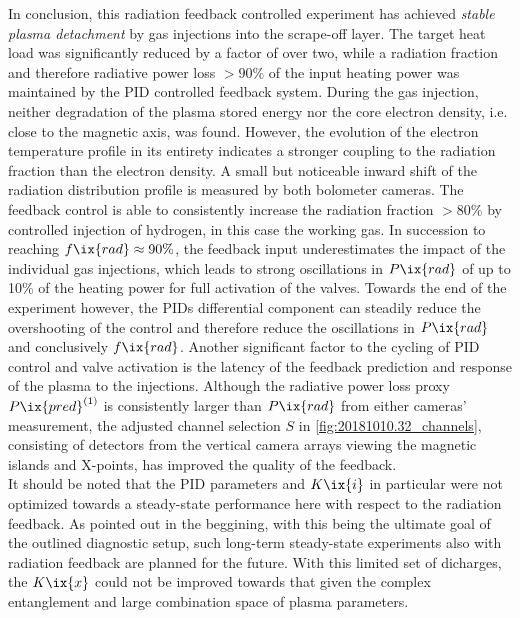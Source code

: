             In conclusion, this radiation feedback controlled experiment has achieved \textit{stable plasma detachment} by gas injections into the scrape-off layer. The target heat load was significantly reduced by a factor of over two, while a radiation fraction and therefore radiative power loss $>90\%$ of the input heating power was maintained by the PID controlled feedback system. During the gas injection, neither degradation of the plasma stored energy nor the core electron density, i.e. close to the magnetic axis, was found. However, the evolution of the electron temperature profile in its entirety indicates a stronger coupling to the radiation fraction than the electron density. A small but noticeable inward shift of the radiation distribution profile is measured by both bolometer cameras. The feedback control is able to consistently increase the radiation fraction $>80\%$ by controlled injection of hydrogen, in this case the working gas. In succession to reaching $f\ix{rad}\approx90\%$, the feedback input underestimates the impact of the individual gas injections, which leads to strong oscillations in $P\ix{rad}$ of up to 10\% of the heating power for full activation of the valves. Towards the end of the experiment however, the PIDs differential component can steadily reduce the overshooting of the control and therefore reduce the oscillations in $P\ix{rad}$ and conclusively $f\ix{rad}$. Another significant factor to the cycling of PID control and valve activation is the latency of the feedback prediction and response of the plasma to the injections. Although the radiative power loss proxy $P\ix{pred}^{\left(1\right)}$ is consistently larger than $P\ix{rad}$ from either cameras' measurement, the adjusted channel selection $S$ in \cref{fig:20181010.32_channels}, consisting of detectors from the vertical camera arrays viewing the magnetic islands and X-points, has improved the quality of the feedback.\\%
            It should be noted that the PID parameters and $K\ix{i}$ in particular were not optimized towards a steady-state performance here with respect to the radiation feedback. As pointed out in the beggining, with this being the ultimate goal of the outlined diagnostic setup, such long-term steady-state experiments also with radiation feedback are planned for the future. With this limited set of dicharges, the $K\ix{x}$ could not be improved towards that given the complex entanglement and large combination space of plasma parameters.%
%
